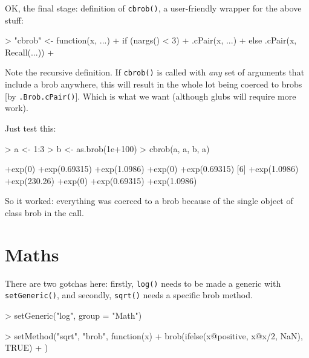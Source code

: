 \documentclass[a4paper]{article}
\begin{document}
OK, the final stage: definition of {\tt cbrob()}, a user-friendly
wrapper for the above stuff:

\begin{Schunk}
\begin{Sinput}
> "cbrob" <- function(x, ...) {
+     if (nargs() < 3) 
+         .cPair(x, ...)
+     else .cPair(x, Recall(...))
+ }
\end{Sinput}
\end{Schunk}


Note the recursive definition.  If {\tt cbrob()} is called with {\em
any} set of arguments that include a brob anywhere, this will result
in the whole lot being coerced to brobs [by {\tt .Brob.cPair()}].
Which is what we want (although glubs will require more work).


Just test this:
\begin{Schunk}
\begin{Sinput}
> a <- 1:3
> b <- as.brob(1e+100)
> cbrob(a, a, b, a)
\end{Sinput}
\begin{Soutput}
 [1] +exp(0)       +exp(0.69315) +exp(1.0986)  +exp(0)       +exp(0.69315)
 [6] +exp(1.0986)  +exp(230.26)  +exp(0)       +exp(0.69315) +exp(1.0986) 
\end{Soutput}
\end{Schunk}

So it worked: everything was coerced to a brob because of the single
object of class brob in the call.


\section{Maths}

There are two gotchas here: firstly, {\tt log()} needs to be made a
generic with {\tt setGeneric()}, and secondly, {\tt sqrt()} needs a
specific brob method.

\begin{Schunk}
\begin{Sinput}
> setGeneric("log", group = "Math")
\end{Sinput}
\end{Schunk}

\begin{Schunk}
\begin{Sinput}
> setMethod("sqrt", "brob", function(x) {
+     brob(ifelse(x@positive, x@x/2, NaN), TRUE)
+ })
\end{Sinput}
\end{Schunk}
\end{document}
